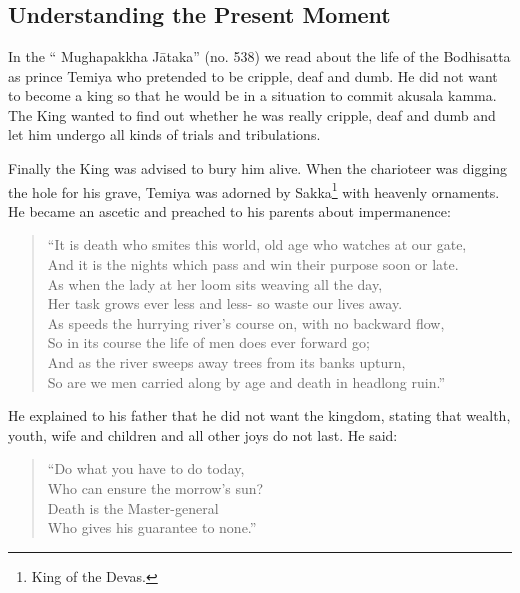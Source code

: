 \chapter[Understanding the Present Moment]{}
\section*{Understanding the Present Moment}

In the `` Mughapakkha Jātaka'' (no. 538) we read about the life of the
Bodhisatta as prince Temiya who pretended to be cripple, deaf and dumb.
He did not want to become a king so that he would be in a situation to
commit akusala kamma. The King wanted to find out whether he was really
cripple, deaf and dumb and let him undergo all kinds of trials and
tribulations. 

Finally the King was advised to bury him alive. When the charioteer
was digging the hole for his grave, Temiya was adorned by
Sakka\footnote{King of the Devas.}
with heavenly ornaments. He became an ascetic and preached to his
parents about impermanence:

\begin{verse}



``It is death who smites this world, old age who watches at our gate,\\
And it is the nights which pass and win their purpose soon or late.\\
As when the lady at her loom sits weaving all the day,\\
Her task grows ever less and less- so waste our lives away.\\
As speeds the hurrying river's course on, with no backward flow,\\
So in its course the life of men does ever forward go;\\
And as the river sweeps away trees from its banks upturn,\\
So are we men carried along by age and death in headlong ruin.''
\end{verse}

He explained to his father that he did not want the kingdom, stating
that wealth, youth, wife and children and all other joys do not last.
He said:

\begin{verse}

``Do what you have to do today,\\
Who can ensure the morrow's sun?\\
Death is the Master-general\\
Who gives his guarantee to none.''

\end{verse}

